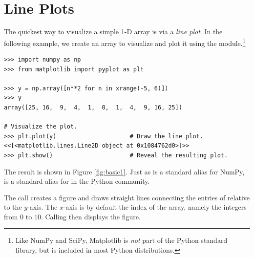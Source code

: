 \label{lab:Matplotlib_and_Mayavi}


\section*{Line Plots} %

The quickest way to visualize a simple 1-D array is via a \emph{line plot}.
In the following example, we create an array to visualize and plot it using the  module.\footnote{Like NumPy and SciPy, Matplotlib is \emph{not} part of the Python standard library, but is included in most Python distributions.}

\begin{lstlisting}
>>> import numpy as np
>>> from matplotlib import pyplot as plt

>>> y = np.array([n**2 for n in xrange(-5, 6)])
>>> y
array([25, 16,  9,  4,  1,  0,  1,  4,  9, 16, 25])

# Visualize the plot.
>>> plt.plot(y)                     # Draw the line plot.
<<[<matplotlib.lines.Line2D object at 0x1084762d0>]>>
>>> plt.show()                      # Reveal the resulting plot.
\end{lstlisting}

The result is shown in Figure \ref{fig:basic1}.
Just as  is a standard alias for NumPy,  is a standard alias for  in the Python community.

The call  creates a figure and draws straight lines connecting the entries of  relative to the $y$-axis.
The $x$-axis is by default the index of the array, namely the integers from $0$ to $10$.
Calling  then displays the figure.

